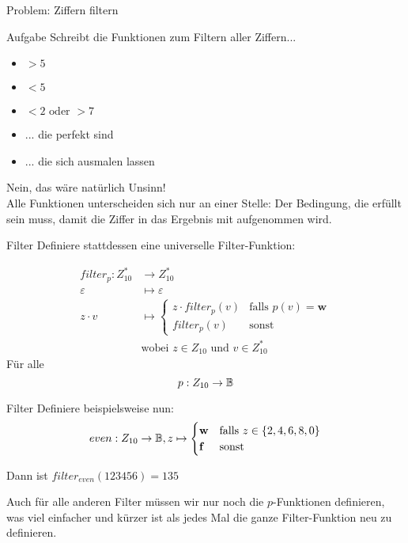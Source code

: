 \begin{frame}{Problem: Ziffern filtern}
	\begin{block}{Aufgabe}
		Schreibt die Funktionen zum Filtern aller Ziffern...
		\begin{itemize}
			\item $> 5$
			\item $< 5$
			\item $<2 \text{ oder } >7$
			\item ... die perfekt sind
			\item ... die sich ausmalen lassen
		\end{itemize}
	\end{block}

	\pause
	Nein, das wäre natürlich Unsinn!\\
	Alle Funktionen unterscheiden sich nur an einer Stelle: \pause Der Bedingung, die erfüllt sein muss, damit die Ziffer in das Ergebnis mit aufgenommen wird.\\
\end{frame}

\begin{frame}{Filter}
	Definiere stattdessen eine universelle Filter-Funktion:
	
	\begin{align*}
		filter_p : Z^*_{10} &\to Z^*_{10} \\
		\varepsilon &\mapsto \varepsilon \\
		z \cdot v &\mapsto \begin{cases}
		z \cdot filter_p(v) &\text{falls } p(v) = \textbf{w}\\
		filter_p(v) &\text{sonst}
		\end{cases}\\
		&\text{wobei } z \in Z_{10} \text{ und } v \in Z_{10}^*
	\end{align*}
	Für alle $$p: Z_{10} \to \mathbb{B}$$
\end{frame}

\begin{frame}{Filter}
	Definiere beispielsweise nun:
	$$ even:  Z_{10} \to \mathbb{B}, z \mapsto \begin{cases}
	\textbf{w} &\text{falls } z \in \{2, 4, 6, 8, 0\}\\
	\textbf{f} &\text{sonst }
	\end{cases}$$
	
	Dann ist $filter_{even}(123456) = 135$
	
	Auch für alle anderen Filter müssen wir nur noch die $p$-Funktionen definieren, was viel einfacher und kürzer ist als jedes Mal die ganze Filter-Funktion neu zu definieren.
\end{frame}

